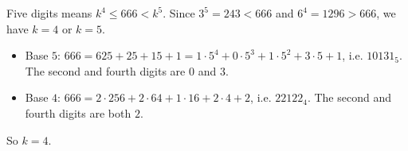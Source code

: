 Five digits means $k^4\le666<k^5$. Since $3^5=243<666$ and $6^4=1296>666$, we have $k=4$ or $k=5$.
\begin{itemize}
\item Base $5$: $666=625+25+15+1=1\cdot5^4+0\cdot5^3+1\cdot5^2+3\cdot5+1$, i.e. $10131_5$. The second and fourth digits are $0$ and $3$.
\item Base $4$: $666=2\cdot256+2\cdot64+1\cdot16+2\cdot4+2$, i.e. $22122_4$. The second and fourth digits are both $2$.
\end{itemize}
So $k=\boxed{4}$.
